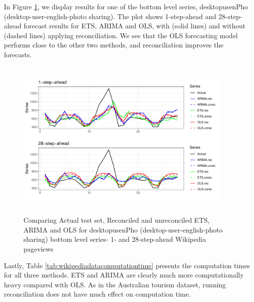 \documentclass[11pt,a4paper,]{article}
\begin{document}
In Figure \ref{fig:forecstrolling28wiki}, we display results for one of the bottom level series, desktopusenPho (desktop-user-english-photo sharing). The plot shows 1-step-ahead and 28-step-ahead forecast results for ETS, ARIMA and OLS, with (solid lines) and without (dashed lines) applying reconciliation. We see that the OLS forecasting model performs close to the other two methods, and reconciliation improves the forecasts.

\begin{figure}

{\centering \includegraphics[width=400px,height=300px]{hcf_files/figure-latex/forecstrolling28wiki-1} 

}

\caption{Comparing Actual test set, Reconciled and unreconciled ETS, ARIMA and OLS for desktopusenPho (desktop-user-english-photo sharing)  bottom level series- 1- and 28-step-ahead Wikipedia pageviews}\label{fig:forecstrolling28wiki}
\end{figure}

Lastly, Table \ref{tab:wikipediadatacomputationtime} presents the computation times for all three methods. ETS and ARIMA are clearly much more computationally heavy compared with OLS. As in the Australian tourism dataset, running reconciliation does not have much effect on computation time.
\end{document}
